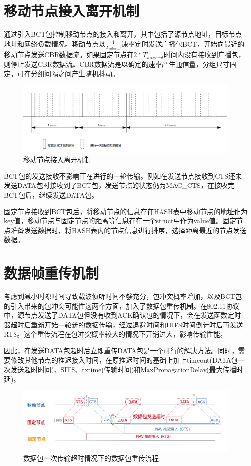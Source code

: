 \section {移动节点接入离开机制}
通过引入BCT包控制移动节点的接入和离开，其中包括了源节点地址，目标节点地址和网络负载情况。移动节点以$\frac{1}{T_{interval}}$速率定时发送广播包BCT，开始向最近的移动节点发送CBR数据流。如果固定节点在$2*T_{interval}$时间内没有接收到广播包，则停止发送CBR数据流。CBR数据流是以确定的速率产生通信量，分组尺寸固定，可在分组间隔之间产生随机抖动。
\begin{figure}[!ht]
	\centering
	\includegraphics[scale=0.4]{figures/mj.png}
	\caption{
		移动节点接入离开机制
	}
	\label{fig:example}
\end{figure}
BCT包的发送接收不影响正在进行的一轮传输。例如在发送节点接收到CTS还未发送DATA包时接收到了BCT包，发送节点的状态仍为MAC\_CTS，在接收完BCT包后，继续发送DATA包。

固定节点接收到BCT包后，将移动节点的信息存在HASH表中移动节点的地址作为key值，移动节点与固定节点的距离等信息存在一个struct中作为value值。固定节点准备发送数据时，将HASH表内的节点信息进行排序，选择距离最近的节点发送数据。

\section {数据帧重传机制}
考虑到减小时隙时间导致载波侦听时间不够充分，包冲突概率增加，以及BCT包的引入带来的包冲突可能性这两个方面，加入了数据包重传机制。在802.11协议中，源节点发送了DATA包但没有收到ACK确认包的情况下，会在发送函数定时器超时后重新开始一轮新的数据传输，经过退避时间和DIFS时间倒计时后再发送RTS。这个重传流程在包冲突概率较大的情况下开销过大，影响传输性能。

因此，在发送DATA包超时后立即重传DATA包是一个可行的解决方法。同时，需要修改其他节点的推迟接入时间，在原推迟时间的基础上加上timeout(DATA包一次发送超时时间)、SIFS、txtime(传输时间)和MaxPropagationDelay(最大传播时延)。

\begin{figure}[!ht]
	\centering
	\includegraphics[scale=0.4]{figures/chongchuan.png}
	\caption{
	     数据包一次传输超时情况下的数据包重传流程
	}
	\label{fig:example}
\end{figure}

